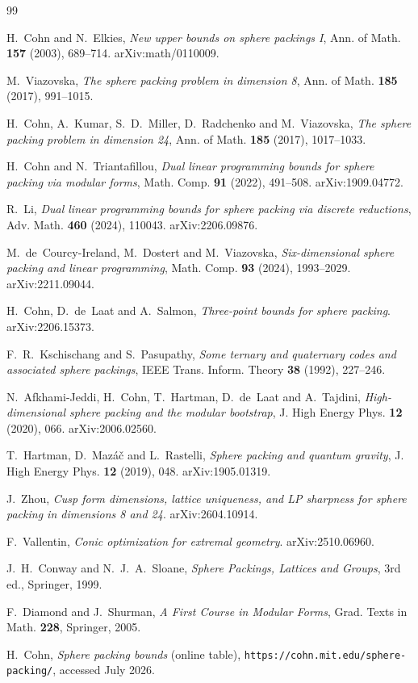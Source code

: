 \documentclass[11pt]{article}
\theoremstyle{remark}
\begin{document}
\begin{thebibliography}{99}

 H.~Cohn and N.~Elkies,
\emph{New upper bounds on sphere packings I},
Ann. of Math. \textbf{157} (2003), 689--714. arXiv:math/0110009.

 M.~Viazovska,
\emph{The sphere packing problem in dimension 8},
Ann. of Math. \textbf{185} (2017), 991--1015.

 H.~Cohn, A.~Kumar, S.~D.~Miller, D.~Radchenko and
M.~Viazovska, \emph{The sphere packing problem in dimension 24},
Ann. of Math. \textbf{185} (2017), 1017--1033.

 H.~Cohn and N.~Triantafillou,
\emph{Dual linear programming bounds for sphere packing via modular
forms}, Math. Comp. \textbf{91} (2022), 491--508. arXiv:1909.04772.

 R.~Li,
\emph{Dual linear programming bounds for sphere packing via discrete
reductions}, Adv. Math. \textbf{460} (2024), 110043. arXiv:2206.09876.

 M.~de~Courcy-Ireland, M.~Dostert and M.~Viazovska,
\emph{Six-dimensional sphere packing and linear programming},
Math. Comp. \textbf{93} (2024), 1993--2029. arXiv:2211.09044.

 H.~Cohn, D.~de~Laat and A.~Salmon,
\emph{Three-point bounds for sphere packing}. arXiv:2206.15373.

 F.~R.~Kschischang and S.~Pasupathy,
\emph{Some ternary and quaternary codes and associated sphere packings},
IEEE Trans. Inform. Theory \textbf{38} (1992), 227--246.

 N.~Afkhami-Jeddi, H.~Cohn, T.~Hartman, D.~de~Laat and
A.~Tajdini, \emph{High-dimensional sphere packing and the modular
bootstrap}, J. High Energy Phys. \textbf{12} (2020), 066.
arXiv:2006.02560.

 T.~Hartman, D.~Maz\'a\v{c} and L.~Rastelli,
\emph{Sphere packing and quantum gravity},
J. High Energy Phys. \textbf{12} (2019), 048. arXiv:1905.01319.

 J.~Zhou,
\emph{Cusp form dimensions, lattice uniqueness, and LP sharpness for
sphere packing in dimensions 8 and 24}. arXiv:2604.10914.

 F.~Vallentin,
\emph{Conic optimization for extremal geometry}. arXiv:2510.06960.

 J.~H.~Conway and N.~J.~A.~Sloane,
\emph{Sphere Packings, Lattices and Groups}, 3rd ed., Springer, 1999.

 F.~Diamond and J.~Shurman,
\emph{A First Course in Modular Forms}, Grad. Texts in Math. \textbf{228},
Springer, 2005.

 H.~Cohn, \emph{Sphere packing bounds} (online table),
\texttt{https://cohn.mit.edu/sphere-packing/}, accessed July 2026.

\end{thebibliography}
\end{document}
